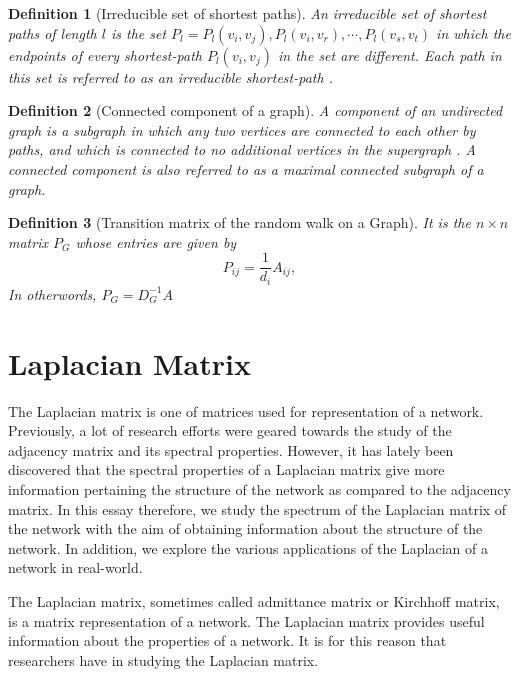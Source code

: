 \documentclass[10pt,a4paper]{article}
\newtheorem{defn}{Definition}
\begin{document}
\begin{defn}[Irreducible set of shortest paths]
	
	An irreducible set of shortest paths of length $l$ is the set $P_l ={P_l(v_i,v_j),P_l(v_i,v_r),\cdots, P_l(v_s,v_t)}$ in which the endpoints of every shortest-path $P_l(v_i,v_j)$ in the set are different.
	Each path in this set is referred to as an irreducible shortest-path \citep{estrada2012path}.\end{defn}

\begin{defn}[Connected component of a graph]
	A component of an undirected graph is a subgraph in which any two vertices are connected to each other by paths, and which is connected to no additional vertices in the supergraph \citep{newman2010networks}. 
	A connected component is also referred to as a maximal connected subgraph of a graph.
\end{defn}

\begin{defn}[Transition matrix of the random walk on a Graph]
	It is the $n \times n$ matrix $P_G$ whose entries are given by
	\begin{equation}
	P_{ij} = \frac{1}{d_i} A_{ij},
	\end{equation}
	In otherwords, $P_G = D_{G} ^ {-1} A$
\end{defn}

\section{Laplacian Matrix}
The Laplacian matrix is one of matrices used for representation of a network. Previously, a lot of research efforts were geared towards the study of the adjacency matrix and its spectral properties. However, it has lately been discovered that the spectral properties of a Laplacian matrix give more information pertaining the structure of the network as compared to the adjacency matrix. In this essay therefore, we study the spectrum of the Laplacian matrix of the network with the aim of obtaining information about the structure of the network. In addition, we explore the various applications of the Laplacian of a network in real-world.

The Laplacian matrix, sometimes called admittance matrix or Kirchhoff matrix, is a matrix representation of a network. The Laplacian matrix provides useful information about the properties of a network. 
It is for this reason that researchers have in studying the Laplacian matrix.
\end{document}
